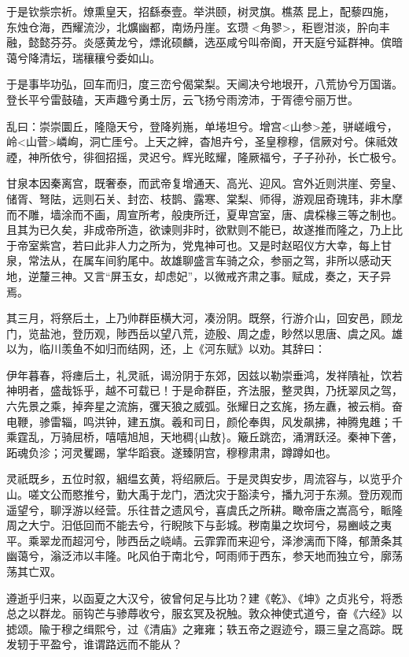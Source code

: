 \documentclass[]{article}
\begin{document}
于是钦祡宗祈。燎熏皇天，招繇泰壹。举洪颐，树灵旗。樵蒸昆上，配藜四施，东烛仓海，西耀流沙，北爌幽都，南炀丹崖。玄瓒\textless{}角翏\textgreater{}，秬鬯泔淡，肸向丰融，懿懿芬芬。炎感黄龙兮，熛讹硕麟，选巫咸兮叫帝阍，开天庭兮延群神。傧暗蔼兮降清坛，瑞穰穰兮委如山。

于是事毕功弘，回车而归，度三峦兮偈棠梨。天阃决兮地垠开，八荒协兮万国谐。登长平兮雷鼓磕，天声趣兮勇士厉，云飞扬兮雨滂沛，于胥德兮丽万世。

乱曰：崇崇圜丘，隆隐天兮，登降峛崺，单埢坦兮。增宫\textless{}山参\textgreater{}差，骈嵯峨兮，岭\textless{}山菅\textgreater{}嶙峋，洞亡厓兮。上天之縡，杳旭卉兮，圣皇穆穆，信厥对兮。俫祗效禋，神所依兮，徘徊招摇，灵迟兮。辉光眩耀，隆厥福兮，子子孙孙，长亡极兮。

甘泉本因秦离宫，既奢泰，而武帝复增通天、高光、迎风。宫外近则洪崖、旁皇、储胥、弩阹，远则石关、封峦、枝鹊、露寒、棠梨、师得，游观屈奇瑰玮，非木摩而不雕，墙涂而不画，周宣所考，般庚所迁，夏卑宫室，唐、虞棌椽三等之制也。且其为已久矣，非成帝所造，欲谏则非时，欲默则不能已，故遂推而隆之，乃上比于帝室紫宫，若曰此非人力之所为，党鬼神可也。又是时赵昭仪方大幸，每上甘泉，常法从，在属车间豹尾中。故雄聊盛言车骑之众，参丽之驾，非所以感动天地，逆釐三神。又言``屏玉女，却虑妃''，以微戒齐肃之事。赋成，奏之，天子异焉。

其三月，将祭后土，上乃帅群臣横大河，凑汾阴。既祭，行游介山，回安邑，顾龙门，览盐池，登历观，陟西岳以望八荒，迹殷、周之虚，眇然以思唐、虞之风。雄以为，临川羡鱼不如归而结网，还，上《河东赋》以劝。其辞曰：

伊年暮春，将瘗后土，礼灵祇，谒汾阴于东郊，因兹以勒崇垂鸿，发祥隤祉，饮若神明者，盛哉铄乎，越不可载已！于是命群臣，齐法服，整灵舆，乃抚翠凤之驾，六先景之乘，掉奔星之流旃，彏天狼之威弧。张耀日之玄旄，扬左纛，被云梢。奋电鞭，骖雷辎，鸣洪钟，建五旗。羲和司日，颜伦奉舆，风发飙拂，神腾鬼趡；千乘霆乱，万骑屈桥，嘻嘻旭旭，天地稠\{山敖\}。簸丘跳峦，涌渭跃泾。秦神下詟，跖魂负沴；河灵矍踢，掌华蹈衰。遂臻阴宫，穆穆肃肃，蹲蹲如也。

灵祇既乡，五位时叙，絪缊玄黄，将绍厥后。于是灵舆安步，周流容与，以览乎介山。嗟文公而愍推兮，勤大禹于龙门，洒沈灾于豁渎兮，播九河于东濒。登历观而遥望兮，聊浮游以经营。乐往昔之遗风兮，喜虞氏之所耕。瞰帝唐之嵩高兮，眽隆周之大宁。汨低回而不能去兮，行睨陔下与彭城。秽南巢之坎坷兮，易豳岐之夷平。乘翠龙而超河兮，陟西岳之峣崝。云霏霏而来迎兮，泽渗漓而下降，郁萧条其幽蔼兮，滃泛沛以丰隆。叱风伯于南北兮，呵雨师于西东，参天地而独立兮，廓荡荡其亡双。

遵逝乎归来，以函夏之大汉兮，彼曾何足与比功？建《乾》、《坤》之贞兆兮，将悉总之以群龙。丽钩芒与骖蓐收兮，服玄冥及祝触。敦众神使式道兮，奋《六经》以摅颂。隃于穆之缉熙兮，过《清庙》之雍雍；轶五帝之遐迹兮，蹑三皇之高踪。既发轫于平盈兮，谁谓路远而不能从？
\end{document}
